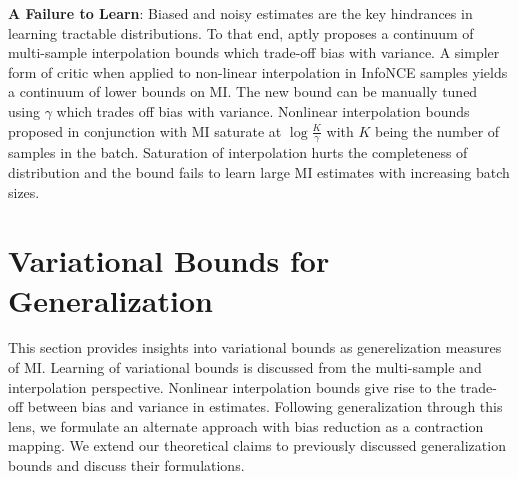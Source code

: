 \documentclass{article}
\begin{document}
\textbf{A Failure to Learn}: Biased and noisy estimates are the key hindrances in learning tractable distributions. To that end, \cite{variational} aptly proposes a continuum of multi-sample interpolation bounds which trade-off bias with variance. A simpler form of critic when applied to non-linear interpolation in InfoNCE samples yields a continuum of lower bounds on MI. The new bound can be manually tuned using $\gamma$ which trades off bias with variance. Nonlinear interpolation bounds proposed in conjunction with MI saturate at $\log \frac{K}{\gamma}$ with $K$ being the number of samples in the batch. Saturation of interpolation hurts the completeness of distribution and the bound fails to learn large MI estimates with increasing batch sizes.  


\section{Variational Bounds for Generalization}
This section provides insights into variational bounds as generelization measures of MI. Learning of variational bounds is discussed from the multi-sample and interpolation perspective. Nonlinear interpolation bounds give rise to the trade-off between bias and variance in estimates. Following generalization through this lens, we formulate an alternate approach with bias reduction as a contraction mapping. We extend our theoretical claims to previously discussed generalization bounds and discuss their formulations.
\end{document}
